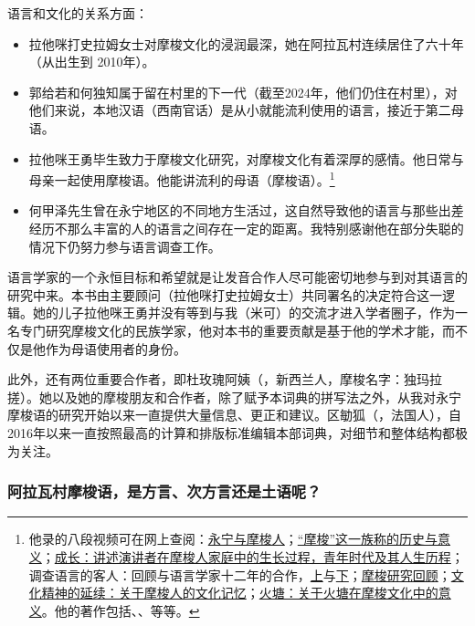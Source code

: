 语言和文化的关系方面：

\begin{itemize}
    \item 拉他咪打史拉姆女士对摩梭文化的浸润最深，她在阿拉瓦村连续居住了六十年（从出生到 2010年）。
    \item 郭给若和何独知属于留在村里的下一代（截至2024年，他们仍住在村里），对他们来说，本地汉语（西南官话）是从小就能流利使用的语言，接近于第二母语。
    \item 拉他咪王勇毕生致力于摩梭文化研究，对摩梭文化有着深厚的感情。他日常与母亲一起使用摩梭语。他能讲流利的母语（摩梭语）。\footnote{他录的八段视频可在网上查阅：\href{https://doi.org/10.24397/pangloss-0007734}{永宁与摩梭人}；\href{https://doi.org/10.24397/pangloss-0007740}{“摩梭”这一族称的历史与意义}；\href{https://doi.org/10.24397/pangloss-0007730}{成长：讲述演讲者在摩梭人家庭中的生长过程，青年时代及其人生历程}；调查语言的客人：回顾与语言学家十二年的合作，\href{https://doi.org/10.24397/pangloss-0007736}{上}与\href{https://doi.org/10. 24397/pangloss-0007738}{下}；\href{https://doi.org/10.24397/pangloss-0007742}{摩梭研究回顾}；\href{https://doi.org/10.24397/pangloss-0007728}{文化精神的延续：关于摩梭人的文化记忆}；\href{https://doi.org/10.24397/pangloss-0007732}{火塘：关于火塘在摩梭文化中的意义}。他的著作包括\textcite{latami2006}、\textcite{latami2009}、\textcite{latami2016}等等。} %
    \item 何甲泽先生曾在永宁地区的不同地方生活过，这自然导致他的语言与那些出差经历不那么丰富的人的语言之间存在一定的距离。我特别感谢他在部分失聪的情况下仍努力参与语言调查工作。
\end{itemize}

语言学家的一个永恒目标和希望就是让发音合作人尽可能密切地参与到对其语言的研究中来。本书由主要顾问（拉他咪打史拉姆女士）共同署名的决定符合这一逻辑。她的儿子拉他咪王勇并没有等到与我（米可）的交流才进入学者圈子，作为一名专门研究摩梭文化的民族学家，他对本书的重要贡献是基于他的学术才能，而不仅是他作为母语使用者的身份。

此外，还有两位重要合作者，即杜玫瑰阿姨（，新西兰人，摩梭名字：独玛拉搓）。她以及她的摩梭朋友和合作者，除了赋予本词典的拼写法之外，从我对永宁摩梭语的研究开始以来一直提供大量信息、更正和建议。区勄狐（，法国人），自2016年以来一直按照最高的计算和排版标准编辑本部词典，对细节和整体结构都极为关注。

\subsubsection*{阿拉瓦村摩梭语，是方言、次方言还是土语呢？}

